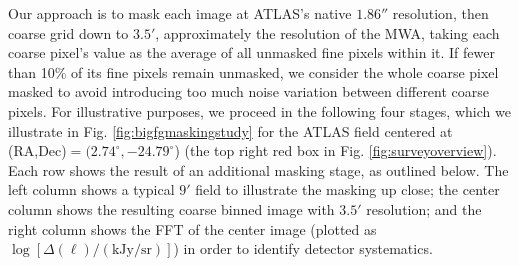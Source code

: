 \documentclass[numberedappendix]{emulateapj}
\begin{document}
Our approach is to mask each image at ATLAS's native $1.86''$ resolution, then coarse grid down to $3.5'$, approximately the resolution of the MWA, taking each coarse pixel's value as the average of all unmasked fine pixels within it. If fewer than 10\% of its fine pixels remain unmasked, we consider the whole coarse pixel masked to avoid introducing too much noise variation between different coarse pixels. For illustrative purposes, we proceed in the following four stages, which we illustrate in Fig. \ref{fig:bigfgmaskingstudy} for the ATLAS field centered at (RA,Dec)$=(2.74^\circ, -24.79^\circ$) (the top right red box in Fig. \ref{fig:surveyoverview}). Each row shows the result of an additional masking stage, as outlined below. The left column shows a typical $9'$ field to illustrate the masking up close; the center column shows the resulting coarse binned image with $3.5'$ resolution; and the right column shows the FFT of the center image (plotted as $\log[\Delta(\ell)/(\text{kJy/sr})]$) in order to identify detector systematics. 
\end{document}
